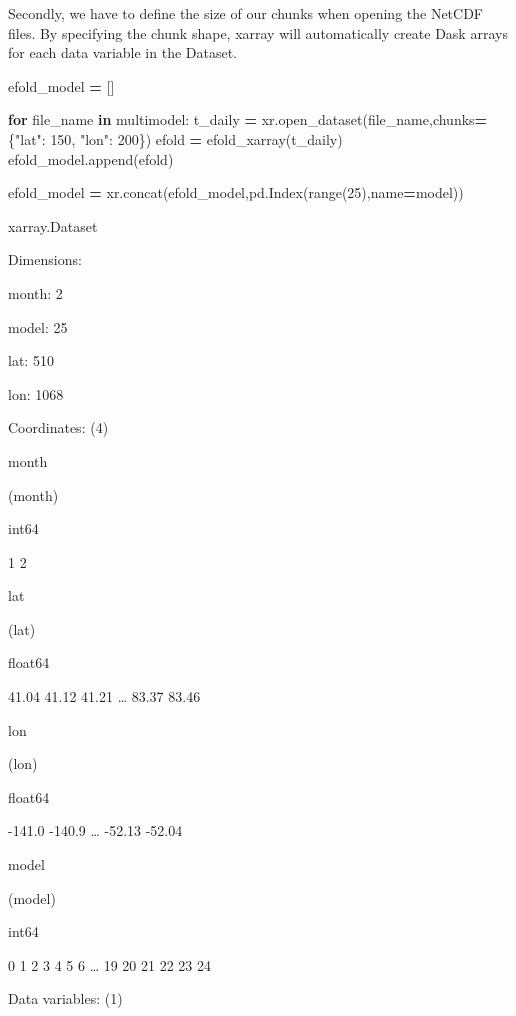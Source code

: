 \documentclass[
]{book}
\newenvironment{Shaded}{\begin{snugshade}}{\end{snugshade}}
\newcommand{\BuiltInTok}[1]{#1}
\newcommand{\ControlFlowTok}[1]{\textcolor[rgb]{0.13,0.29,0.53}{\textbf{#1}}}
\newcommand{\DecValTok}[1]{\textcolor[rgb]{0.00,0.00,0.81}{#1}}
\newcommand{\KeywordTok}[1]{\textcolor[rgb]{0.13,0.29,0.53}{\textbf{#1}}}
\newcommand{\NormalTok}[1]{#1}
\newcommand{\OperatorTok}[1]{\textcolor[rgb]{0.81,0.36,0.00}{\textbf{#1}}}
\newcommand{\StringTok}[1]{\textcolor[rgb]{0.31,0.60,0.02}{#1}}
\begin{document}
Secondly, we have to define the size of our chunks when opening the NetCDF files. By specifying the chunk shape, xarray will automatically create Dask arrays for each data variable in the Dataset.

\begin{Shaded}
\begin{Highlighting}[]
\NormalTok{efold\_model }\OperatorTok{=}\NormalTok{ []}

\ControlFlowTok{for}\NormalTok{ file\_name }\KeywordTok{in}\NormalTok{ multimodel:}
\NormalTok{        t\_daily }\OperatorTok{=}\NormalTok{ xr.open\_dataset(file\_name,chunks}\OperatorTok{=}\NormalTok{\{}\StringTok{"lat"}\NormalTok{: }\DecValTok{150}\NormalTok{, }\StringTok{"lon"}\NormalTok{: }\DecValTok{200}\NormalTok{\})}
\NormalTok{        efold }\OperatorTok{=}\NormalTok{ efold\_xarray(t\_daily)}
\NormalTok{        efold\_model.append(efold)}

\NormalTok{efold\_model }\OperatorTok{=}\NormalTok{ xr.concat(efold\_model,pd.Index(}\BuiltInTok{range}\NormalTok{(}\DecValTok{25}\NormalTok{),name}\OperatorTok{=}\StringTok{\textquotesingle{}model\textquotesingle{}}\NormalTok{))}
\end{Highlighting}
\end{Shaded}

xarray.Dataset

Dimensions:

{month}: 2

{model}: 25

{lat}: 510

{lon}: 1068

Coordinates: {(4)}

{month}

(month)

int64

1 2

{lat}

(lat)

float64

41.04 41.12 41.21 \ldots{} 83.37 83.46

{lon}

(lon)

float64

-141.0 -140.9 \ldots{} -52.13 -52.04

{model}

(model)

int64

0 1 2 3 4 5 6 \ldots{} 19 20 21 22 23 24

Data variables: {(1)}
\end{document}

